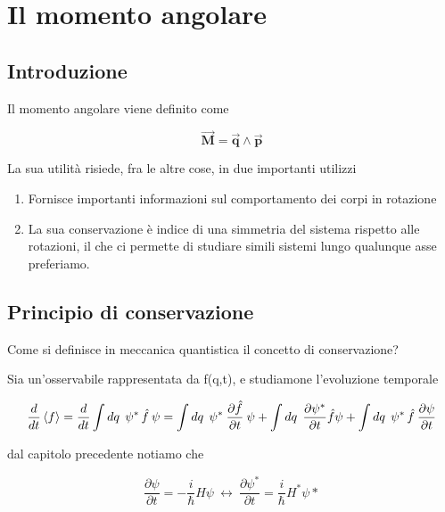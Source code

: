 \chapter{Il momento angolare}


\section{Introduzione}

Il momento angolare viene definito come

\begin{equation}
\vec{\mathbf{M}}= \vec{\mathbf{q}} \wedge \vec{\mathbf{p}}
\end{equation}

La sua utilità risiede, fra le altre cose, in due importanti utilizzi

\begin{enumerate}
	
	\item Fornisce importanti informazioni sul comportamento dei corpi in rotazione
	
	\item	La sua conservazione è indice di una simmetria del sistema rispetto alle rotazioni, il che ci permette di studiare simili sistemi lungo qualunque asse preferiamo.
	\end{enumerate}

\section{Principio di conservazione}

Come si definisce in meccanica quantistica il concetto di conservazione?

Sia un'osservabile rappresentata da f(q,t), e studiamone l'evoluzione temporale

\begin{equation}
\frac{d}{dt}\braket{f} = \frac{d}{dt} \int dq \:\: \psi^* \, \hat f \: \psi = 
\int dq \:\: \psi^* \: \frac{\partial \hat f}{\partial t} \: \psi + 
\int dq \:\: \frac{\partial \psi^*}{\partial t} \hat f \psi + 
\int dq \:\: \psi^* \, \hat f \: \frac{\partial \psi}{\partial t}
\end{equation}

dal capitolo precedente notiamo che

\begin{equation}
\frac{\partial \psi}{\partial t} = -\frac{i}{\hbar}H\psi
\: \leftrightarrow \:
\frac{\partial \psi^*}{\partial t} = \frac{i}{\hbar}H^*\psi*
\end{equation}

